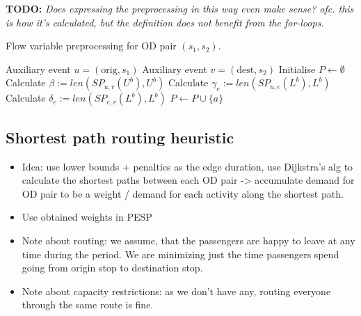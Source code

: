 \documentclass[english, 12pt, a4paper, sci, utf8, a-2b, online]{aaltothesis}
\begin{document}
{
    \color{red}
    \textbf{TODO:} \textit{Does expressing the preprocessing in this way even make sense? ofc. this is how it's calculated, but the definition does not benefit from the for-loops.}
}
\begin{algorithm}
    \caption{Flow variable preprocessing for OD pair $(s_1, s_2)$.}
    \label{alg:preprocessing}
    \begin{algorithmic}
        \State Auxiliary event $u = (\text{orig}, s_1)$
        \State Auxiliary event $v = (\text{dest}, s_2)$
        \State Initialise $P \gets \emptyset$
        \State Calculate $\beta := len(SP_{u,v}(U^b), U^b)$
            \State Calculate $\gamma_e := len(SP_{u,e}(L^b), L^b)$
            \State Calculate $\delta_e := len(SP_{e,v}(L^b), L^b)$
        \EndFor
                \State $P \gets P \cup \{a\}$
            \EndIf
        \EndFor
    \end{algorithmic}
\end{algorithm}
    
\subsection{Shortest path routing heuristic}

\begin{itemize}
    \item Idea: use lower bounds + penalties as the edge duration, use Dijkstra's alg to calculate the shortest paths between each OD pair -> accumulate demand for OD pair to be a weight / demand for each activity along the shortest path.
    \item Use obtained weights in PESP
    \item Note about routing: we assume, that the passengers are happy to leave at any time during the period. We are minimizing just the time passengers spend going from origin stop to destination stop.
    \item Note about capacity restrictions: as we don't have any, routing everyone through the same route is fine.
\end{itemize}
\end{document}
